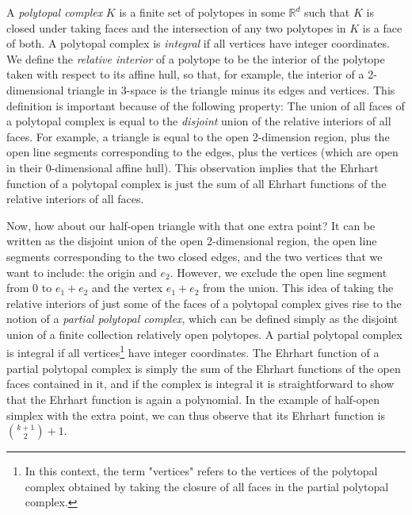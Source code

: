 \documentclass[12pt]{amsart}
\newcommand{\RR}{\mathbb{R}}
\begin{document}
A \emph{polytopal complex} $K$ is a finite set of polytopes in some $\RR^d$ such that $K$ is closed under taking faces and the intersection of any two polytopes in $K$ is a face of both. A polytopal complex is \emph{integral} if all vertices have integer coordinates. We define the \emph{relative interior} of a polytope to be the interior of the polytope taken with respect to its affine hull, so that, for example, the interior of a 2-dimensional triangle in 3-space is the triangle minus its edges and vertices. This definition is important because of the following property: The union of all faces of a polytopal complex is equal to the \emph{disjoint} union of the relative interiors of all faces. For example, a triangle is equal to the open 2-dimension region, plus the open line segments corresponding to the edges, plus the vertices (which are open in their 0-dimensional affine hull). This observation implies that the Ehrhart function of a polytopal complex is just the sum of all Ehrhart functions of the relative interiors of all faces.

Now, how about our half-open triangle with that one extra point? It can be written as the disjoint union of the open 2-dimensional region, the open line segments corresponding to the two closed edges, and the two vertices that we want to include: the origin and $e_2$. However, we exclude the open line segment from 0 to $e_1+e_2$ and the vertex $e_1+e_2$ from the union. This idea of taking the relative interiors of just some of the faces of a polytopal complex gives rise to the notion of a \emph{partial polytopal complex}, which can be defined simply as the disjoint union of a finite collection relatively open polytopes. A partial polytopal complex is integral if all vertices\footnote{In this context, the term "vertices" refers to the vertices of the polytopal complex obtained by taking the closure of all faces in the partial polytopal complex.} have integer coordinates. The Ehrhart function of a partial polytopal complex is simply the sum of the Ehrhart functions of the open faces contained in it, and if the complex is integral it is straightforward to show that the Ehrhart function is again a polynomial. In the example of half-open simplex with the extra point, we can thus observe that its Ehrhart function is $\binom{k+1}{2} + 1$.
\end{document}
